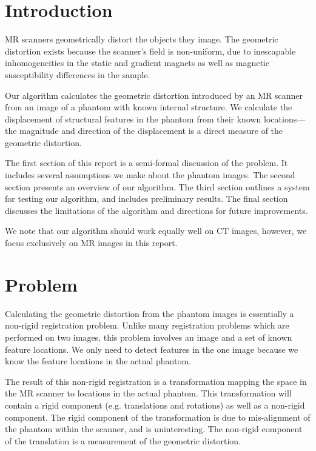 \documentclass[12pt]{article}
\begin{document}
\maketitle

\section*{Introduction}
MR scanners geometrically distort the objects they image.  The geometric distortion exists because the scanner's field is non-uniform, due to inescapable inhomogeneities in the static and gradient magnets as well as magnetic susceptibility differences in the sample.

Our algorithm calculates the geometric distortion introduced by an MR scanner from an image of a phantom with known internal structure.  We calculate the displacement of structural features in the phantom from their known locations---the magnitude and direction of the displacement is a direct measure of the geometric distortion.

The first section of this report is a semi-formal discussion of the problem.  It includes several assumptions we make about the phantom images.  The second section presents an overview of our algorithm.  The third section outlines a system for testing our algorithm, and includes preliminary results.  The final section discusses the limitations of the algorithm and directions for future improvements.

We note that our algorithm should work equally well on CT images, however, we focus exclusively on MR images in this report.

\section*{Problem}
Calculating the geometric distortion from the phantom images is essentially a non-rigid registration problem. Unlike many registration problems which are performed on two images, this problem involves an image and a set of known feature locations.  We only need to detect features in the one image because we know the feature locations in the actual phantom.

The result of this non-rigid registration is a transformation mapping the space in the MR scanner to locations in the actual phantom.  This transformation will contain a rigid component (e.g. translations and rotations) as well as a non-rigid component.  The rigid component of the transformation is due to mis-alignment of the phantom within the scanner, and is uninteresting.  The non-rigid component of the translation is a measurement of the geometric distortion.
\end{document}
